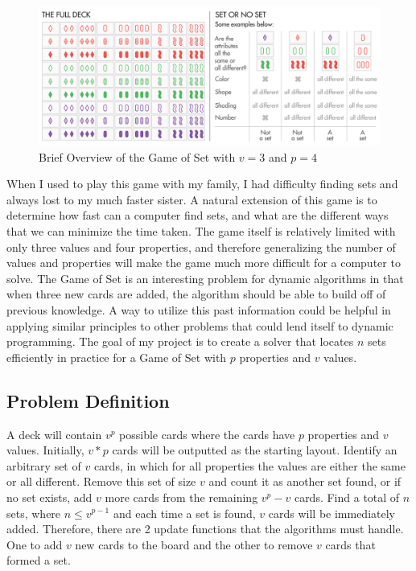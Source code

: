 \documentclass[pageno]{jpaper}
\begin{document}
\begin{figure}[htbb]
\centering
\begin{minipage}[b]{.75\linewidth}
\includegraphics[width=\linewidth]{SetOverview.png}
\caption{Brief Overview of the Game of Set with $v=3$ and $p=4$}
\label{fig:SetOverview}
\end{minipage}
\end{figure}

When I used to play this game with my family, I had difficulty finding sets and always lost to my much faster sister. A natural extension of this game is to determine how fast can a computer find sets, and what are the different ways that we can minimize the time taken. The game itself is relatively limited with only three values and four properties, and therefore generalizing the number of values and properties will make the game much more difficult for a computer to solve. The Game of Set is an interesting problem for dynamic algorithms in that when three new cards are added, the algorithm should be able to build off of previous knowledge. A way to utilize this past information could be helpful in applying similar principles to other problems that could lend itself to dynamic programming. The goal of my project is to create a solver that locates $n$ sets efficiently in practice for a Game of Set with $p$ properties and $v$ values. 


\subsection{Problem Definition}

A deck will contain $v^p$ possible cards where the cards have $p$ properties and $v$ values. Initially, $v*p$ cards will be outputted as the starting layout. Identify an arbitrary set of $v$ cards, in which for all properties the values are either the same or all different. Remove this set of size $v$ and count it as another set found, or if no set exists, add $v$ more cards from the remaining $v^p - v$ cards. Find a total of $n$ sets, where $n \leq v^{p-1}$ and each time a set is found, $v$ cards will be immediately added. Therefore, there are 2 update functions that the algorithms must handle. One to add $v$ new cards to the board and the other to remove $v$ cards that formed a set. 
\end{document}
